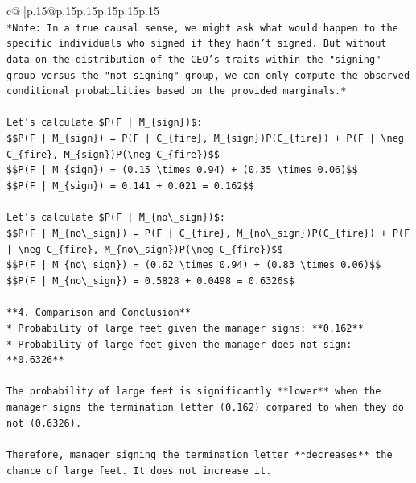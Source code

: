 \documentclass{article}
\begin{document}
{\begin{supertabular}{c@{$\;$}|p{.15\linewidth}@{}p{.15\linewidth}p{.15\linewidth}p{.15\linewidth}p{.15\linewidth}p{.15\linewidth}}
{{{\\ 
\texttt{*Note: In a true causal sense, we might ask what would happen to the specific individuals who signed if they hadn't signed. But without data on the distribution of the CEO's traits within the "signing" group versus the "not signing" group, we can only compute the observed conditional probabilities based on the provided marginals.*} \\
\\ 
\texttt{Let's calculate \$P(F | M\_\{sign\})\$:} \\
\texttt{\$\$P(F | M\_\{sign\}) = P(F | C\_\{fire\}, M\_\{sign\})P(C\_\{fire\}) + P(F | \textbackslash{}neg C\_\{fire\}, M\_\{sign\})P(\textbackslash{}neg C\_\{fire\})\$\$} \\
\texttt{\$\$P(F | M\_\{sign\}) = (0.15 \textbackslash{}times 0.94) + (0.35 \textbackslash{}times 0.06)\$\$} \\
\texttt{\$\$P(F | M\_\{sign\}) = 0.141 + 0.021 = 0.162\$\$} \\
\\ 
\texttt{Let's calculate \$P(F | M\_\{no\textbackslash{}\_sign\})\$:} \\
\texttt{\$\$P(F | M\_\{no\textbackslash{}\_sign\}) = P(F | C\_\{fire\}, M\_\{no\textbackslash{}\_sign\})P(C\_\{fire\}) + P(F | \textbackslash{}neg C\_\{fire\}, M\_\{no\textbackslash{}\_sign\})P(\textbackslash{}neg C\_\{fire\})\$\$} \\
\texttt{\$\$P(F | M\_\{no\textbackslash{}\_sign\}) = (0.62 \textbackslash{}times 0.94) + (0.83 \textbackslash{}times 0.06)\$\$} \\
\texttt{\$\$P(F | M\_\{no\textbackslash{}\_sign\}) = 0.5828 + 0.0498 = 0.6326\$\$} \\
\\ 
\texttt{**4. Comparison and Conclusion**} \\
\texttt{*   Probability of large feet given the manager signs: **0.162**} \\
\texttt{*   Probability of large feet given the manager does not sign: **0.6326**} \\
\\ 
\texttt{The probability of large feet is significantly **lower** when the manager signs the termination letter (0.162) compared to when they do not (0.6326).} \\
\\ 
\texttt{Therefore, manager signing the termination letter **decreases** the chance of large feet. It does not increase it.} \\
\\ 
}}}
\end{supertabular}}
\end{document}
